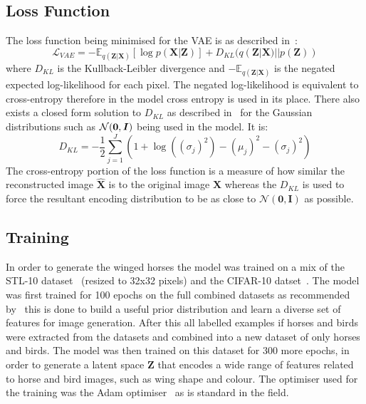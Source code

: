 \documentclass{article}
\begin{document}
\subsection{Loss Function}
The loss function being minimised for the VAE is as described in~\cite{vae}:
\begin{equation}
    \mathcal{L}_{VAE}=
    -\mathbb{E}_{q(\bm{Z}|\bm{X})}[\log p(\bm{X}|\bm{Z})]
    +D_{KL}(q(\bm{Z}|\bm{X})||p(\bm{Z}))
\end{equation}
where $D_{KL}$ is the Kullback-Leibler divergence and $-\mathbb{E}_{q(\bm{Z}|\bm{X})}$ is the negated expected log-likelihood for each pixel. The negated log-likelihood is equivalent to cross-entropy therefore in the model cross entropy is used in its place. There also exists a closed form solution to $D_{KL}$ as described in~\cite{vae} for the Gaussian distributions such as $\mathcal{N}(\bf{0}, \bm{\mathit{I}})$ being used in the model. It is:
\begin{equation}
    D_{KL}=
    -\frac{1}{2}\sum^{J}_{j=1}
    (1+\log((\sigma_j)^2)-
    (\mu_j)^2-
    (\sigma_j)^2
    )
\end{equation}
The cross-entropy portion of the loss function is a measure of how similar the reconstructed image $\bm{\hat{X}}$ is to the original image $\bm{X}$ whereas the $D_{KL}$ is used to force the resultant encoding distribution to be as close to $\mathcal{N}(\bm{0},\bm{I})$ as possible.
\subsection{Training}
In order to generate the winged horses the model was trained on a mix of the STL-10 dataset~\cite{stl} (resized to 32x32 pixels) and the CIFAR-10 datset~\cite{cifar}. The model was first trained for 100 epochs on the full combined datasets as recommended by~\cite{stl-web} this is done to build a useful prior distribution and learn a diverse set of features for image generation. After this all labelled examples if horses and birds were extracted from the datasets and combined into a new dataset of only horses and birds. The model was then trained on this dataset for 300 more epochs, in order to generate a latent space $\bm{Z}$ that encodes a wide range of features related to horse and bird images, such as wing shape and colour. The optimiser used for the training was the Adam optimiser~\cite{adam} as is standard in the field.
\end{document}
